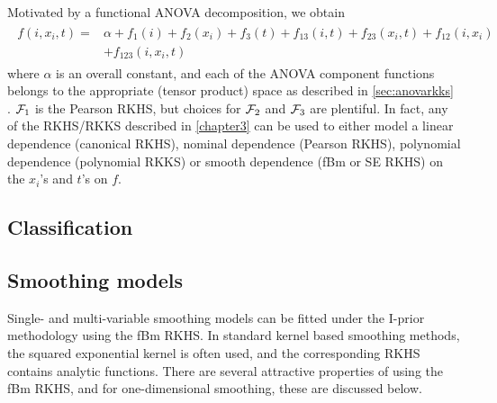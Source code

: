 Motivated by a functional ANOVA decomposition, we obtain
\begin{align}\label{eq:longitudinalanova}
\begin{split}
  f(i,x_i,t) 
  ={}& \alpha + f_1(i) + f_2(x_i) + f_3(t) + f_{13}(i,t) + f_{23}(x_i,t) + f_{12}(i,x_i)  \\
  &+ f_{123}(i,x_i,t)
\end{split}
\end{align}
where $\alpha$ is an overall constant, and each of the ANOVA component functions belongs to the appropriate (tensor product) space as described in \cref{sec:anovarkks} .
${\mathcal F}_1$ is the Pearson RKHS, but choices for ${\mathcal F}_2$ and ${\mathcal F}_3$ are plentiful.
In fact, any of the RKHS/RKKS described in \cref{chapter3} can be used to either model a linear dependence (canonical RKHS), nominal dependence (Pearson RKHS), polynomial dependence (polynomial RKKS) or smooth dependence (fBm or SE RKHS) on the $x_i$'s and $t$'s on $f$.

\subsection{Classification}
\label{sec:naiveclass}


\subsection{Smoothing models}
\label{sec:ipriorsmoothingmod}

Single- and multi-variable smoothing models can be fitted under the I-prior methodology using the fBm RKHS.
In standard kernel based smoothing methods, the squared exponential kernel is often used, and the corresponding RKHS contains analytic functions.
There are several attractive properties of using the fBm RKHS, and for one-dimensional smoothing, these are discussed below.

